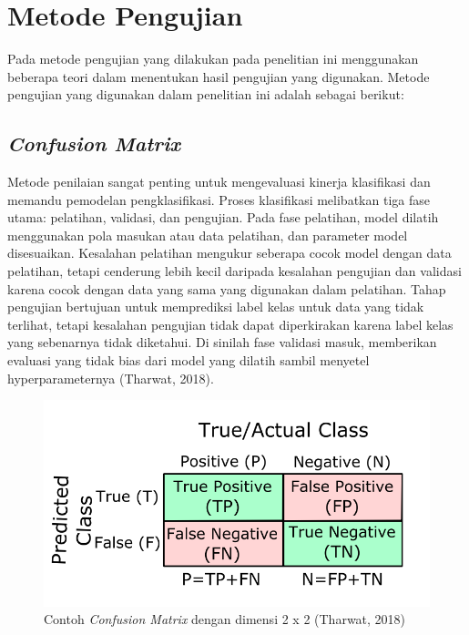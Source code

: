 \section{Metode Pengujian}
\label{sec:deteksigesturtubuh}

Pada metode pengujian yang dilakukan pada penelitian ini menggunakan beberapa teori dalam menentukan hasil pengujian yang digunakan. Metode pengujian yang digunakan dalam penelitian ini adalah sebagai berikut:

\subsection{\emph{Confusion Matrix}}
\label{subsec:cnn}

Metode penilaian sangat penting untuk mengevaluasi kinerja klasifikasi dan memandu pemodelan pengklasifikasi. Proses klasifikasi melibatkan tiga fase utama: pelatihan, validasi, dan pengujian. Pada fase pelatihan, model dilatih menggunakan pola masukan atau data pelatihan, dan parameter model disesuaikan. Kesalahan pelatihan mengukur seberapa cocok model dengan data pelatihan, tetapi cenderung lebih kecil daripada kesalahan pengujian dan validasi karena cocok dengan data yang sama yang digunakan dalam pelatihan. Tahap pengujian bertujuan untuk memprediksi label kelas untuk data yang tidak terlihat, tetapi kesalahan pengujian tidak dapat diperkirakan karena label kelas yang sebenarnya tidak diketahui. Di sinilah fase validasi masuk, memberikan evaluasi yang tidak bias dari model yang dilatih sambil menyetel hyperparameternya (Tharwat, 2018).

\begin{figure}[H]
  \centering
  \includegraphics[scale=0.5]{gambar/confusionmatrix.png}
  \caption{Contoh \emph{Confusion Matrix} dengan dimensi 2 x 2 (Tharwat, 2018)}
  \label{fig:confusionmatrixex}
\end{figure}

